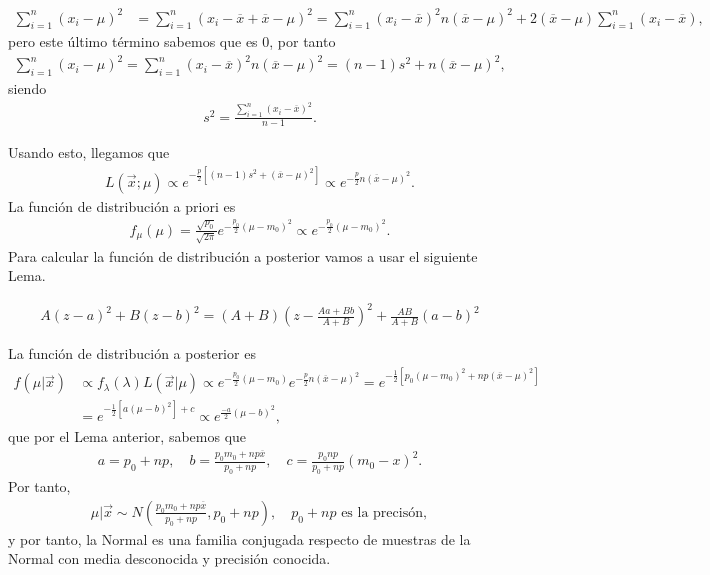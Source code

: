 \begin{obs}
    \begin{align*}
        \sum_{i=1}^{n} (x_i - \mu)^2 &= \sum_{i=1}^{n} (x_i - \overline{x} + \overline{x} - \mu)^2 = \sum_{i=1}^{n} (x_i - \overline{x})^2 n(\overline{x} - \mu)^2 + 2(\overline{x} - \mu)\sum_{i=1}^{n} (x_i - \overline{x}),
    \end{align*}
    pero este último término sabemos que es 0, por tanto
    \begin{align*}
        \sum_{i=1}^{n} (x_i - \mu)^2 = \sum_{i=1}^{n} (x_i - \overline{x})^2 n(\overline{x} - \mu)^2 = (n-1)s^2 + n(\overline{x} - \mu)^2,
    \end{align*}
    siendo
    \begin{align*}
        s^2 = \frac{\sum_{i=1}^{n} (x_i - \overline{x})^2}{n-1}.
    \end{align*}
\end{obs}
Usando esto, llegamos que
\begin{align*}
    L(\vec{x};\mu) \propto e^{-\frac{p}{2}[(n-1)s^2 + (\overline{x} - \mu)^2]} \propto e^{-\frac{p}{2}n(\overline{x} - \mu)^2}.
\end{align*}
La función de distribución a priori es
\begin{align*}
    f_{\mu}(\mu) = \frac{\sqrt{p_0}}{\sqrt{2\pi}} e^{-\frac{p_0}{2}(\mu-m_0)^2} \propto e^{-\frac{p_0}{2}(\mu-m_0)^2}.
\end{align*}
Para calcular la función de distribución a posterior vamos a usar el siguiente Lema.
\begin{lema}
    \begin{align*}
        A(z-a)^2 + B(z-b)^2 = (A+B)\left( z - \frac{Aa + Bb}{A+B} \right)^2 + \frac{AB}{A+B}(a-b)^2
    \end{align*}
\end{lema}
La función de distribución a posterior es
\begin{align*}
    f(\mu | \vec{x}) & \propto f_{\lambda}(\lambda) L(\vec{x} | \mu) \propto e^{-\frac{p_0}{2}(\mu - m_0)} e^{-\frac{p}{2}n(\overline{x} - \mu)^2} = e^{-\frac{1}{2}[p_0(\mu-m_0)^2 + np(\overline{x} - \mu)^2]} \\
    & = e^{-\frac{1}{2}[a(\mu - b)^2] + c} \propto e^{\frac{-a}{2}(\mu - b)^2},
\end{align*}
que por el Lema anterior, sabemos que
\begin{align*}
    a = p_0 + np, \quad b = \frac{p_0m_0 + np\overline{x}}{p_0 + np}, \quad c = \frac{p_0np}{p_0 + np}(m_0 - x)^2.
\end{align*}
Por tanto,
\begin{align*}
    \mu | \vec{x} \sim N\left(\frac{p_0m_0 + np\overline{x}}{p_0 + np}, p_0 + np\right), \quad p_0 + np \text{ es la precisón},
\end{align*}
y por tanto, la Normal es una familia conjugada respecto de muestras de la Normal con media desconocida y precisión conocida.


